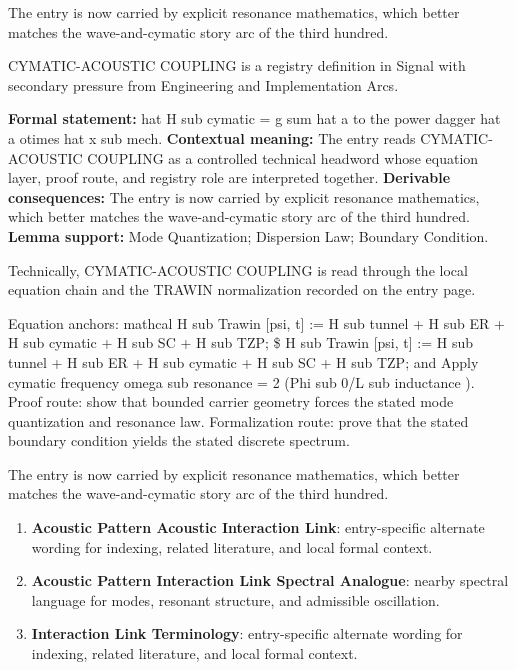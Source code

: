The entry is now carried by explicit resonance mathematics, which better matches the wave-and-cymatic story arc of the third hundred.
\clearpage


\begingroup\small
{}
CYMATIC-ACOUSTIC COUPLING is a registry definition in Signal with secondary pressure from Engineering and Implementation Arcs.

\begingroup\footnotesize\setlength{\emergencystretch}{3em}\sloppy
\textbf{Formal statement:} hat H sub cymatic = g sum hat a to the power dagger hat a otimes hat x sub mech. \textbf{Contextual meaning:} The entry reads CYMATIC-ACOUSTIC COUPLING as a controlled technical headword whose equation layer, proof route, and registry role are interpreted together. \textbf{Derivable consequences:} The entry is now carried by explicit resonance mathematics, which better matches the wave-and-cymatic story arc of the third hundred. \textbf{Lemma support:} Mode Quantization; Dispersion Law; Boundary Condition.\par
\endgroup

Technically, CYMATIC-ACOUSTIC COUPLING is read through the local equation chain and the TRAWIN normalization recorded on the entry page.

Equation anchors: mathcal H sub Trawin [psi, t] := H sub tunnel + H sub ER + H sub cymatic + H sub SC + H sub TZP; \$ H sub Trawin [psi, t] := H sub tunnel + H sub ER + H sub cymatic + H sub SC + H sub TZP; and Apply cymatic frequency omega sub resonance = 2  (Phi sub 0/L sub inductance ). Proof route: show that bounded carrier geometry forces the stated mode quantization and resonance law. Formalization route: prove that the stated boundary condition yields the stated discrete spectrum.

The entry is now carried by explicit resonance mathematics, which better matches the wave-and-cymatic story arc of the third hundred.
\endgroup

\begin{enumerate}[leftmargin=1.6em,itemsep=6pt,topsep=4pt]
\item \textbf{Acoustic Pattern Acoustic Interaction Link}: entry-specific alternate wording for indexing, related literature, and local formal context.
\item \textbf{Acoustic Pattern Interaction Link Spectral Analogue}: nearby spectral language for modes, resonant structure, and admissible oscillation.
\item \textbf{Interaction Link Terminology}: entry-specific alternate wording for indexing, related literature, and local formal context.
\end{enumerate}

